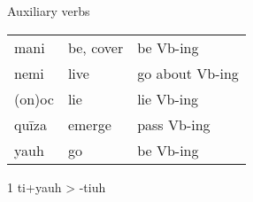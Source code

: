 \documentclass[12pt]{beamer}
\newcommand{\nah}[1]{\textcolor{nahgrn}{#1}}
\newcommand{\trs}[1]{\textcolor{nahblu}{#1}}
\begin{document}
\begin{frame}
\begin{columns}[t]
\begin{column}{.18\linewidth}
\begin{block}{Auxiliary verbs}
\begin{threeparttable}
\begin{tabular}{lll}
                            \nah{mani}   & \trs{be, cover}     & \trs{be Vb-ing}         \\
                            \nah{nemi}   & \trs{live}                & \trs{go   about Vb-ing} \\
                            \nah{(on)oc} & \trs{lie}                 & \trs{lie   Vb-ing}      \\
                            \nah{quīza}  & \trs{emerge}        & \trs{pass   Vb-ing}     \\
                            \nah{yauh}\tnote{1}   & \trs{go}                  & \trs{be Vb-ing}         \\ 
                          \end{tabular}
                          \begin{tablenotes}
                          \item[1] \nah{ti+yauh} > \nah{-tiuh}
                          \end{tablenotes}
                        \end{threeparttable}
                        

\end{block}
\end{column}
\end{columns}
\end{frame}
\end{document}
